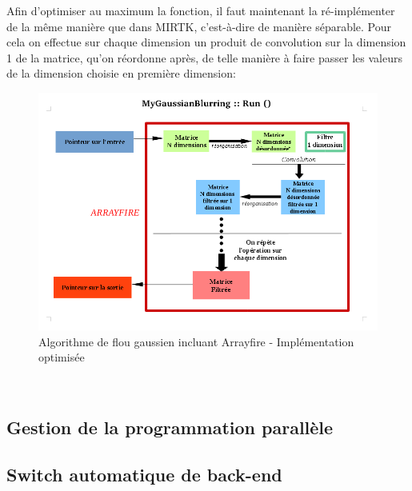 \documentclass[10pt]{report}
\begin{document}
	Afin d'optimiser au maximum la fonction, il faut maintenant la ré-implémenter de la même manière que dans MIRTK, c'est-à-dire de manière séparable. Pour cela on effectue sur chaque dimension un produit de convolution sur la dimension 1 de la matrice, qu'on réordonne après, de telle manière à faire passer les valeurs de la dimension choisie en première dimension: \\
	\begin{figure}[h!]
		\begin{center}
			\includegraphics[width=12cm]{Reports/figures/mygaussianblurring.png}
		\end{center}	
		\caption{Algorithme de flou gaussien incluant Arrayfire - Implémentation optimisée}
		\label{Algorithme de flou gaussien incluant Arrayfire - Implémentation optimisée}
	\end{figure}~\par
	\subsection{Gestion de la programmation parallèle}

	

	
	\subsection{Switch automatique de back-end}
\end{document}
